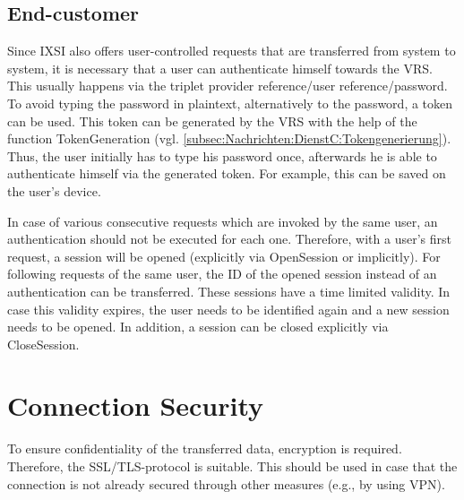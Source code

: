\subsection*{End-customer}
Since IXSI also offers user-controlled requests that are transferred from system to system, it is necessary that a user can authenticate himself towards the VRS.
This usually happens via the triplet provider reference/user reference/password. To avoid typing the password in plaintext, alternatively to the password, a token can be used. This token can be generated by the VRS with the help of the function  TokenGeneration (vgl. \cref{subsec:Nachrichten:DienstC:Tokengenerierung}).
Thus, the user initially has to type his password once, afterwards he is able to authenticate himself via the generated token. For example, this can be saved on the user's device. 

In case of various consecutive requests which are invoked by the same user, an authentication should not be executed for each one. Therefore, with a user's first request, a session will be opened (explicitly via OpenSession or implicitly). For following requests of the same user, the ID of the opened session instead of an authentication can be transferred. These sessions have a time limited validity. In case this validity expires, the user needs to be identified again and a new session needs to be opened. In addition, a session can be closed explicitly via CloseSession.

\section{Connection Security}
To ensure confidentiality of the transferred data, encryption is required. Therefore, the SSL/TLS-protocol is suitable. This should be used in case that the connection is not already secured through other measures (e.g., by using VPN).
